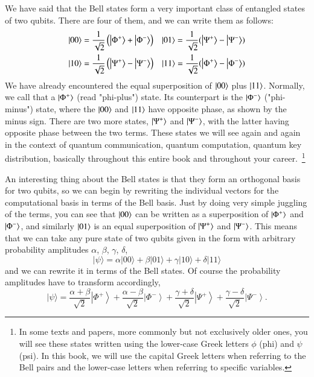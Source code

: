 
We have said that the Bell states form a very important class of entangled states of two qubits. There are four of them, and we can write them as follows: 
\begin{equation}
\begin{aligned}
|00\rangle &=\frac{1}{\sqrt{2}}\left(\left|\Phi^{+}\right\rangle+\left|\Phi^{-}\right\rangle\right) & 
\left| 01 \right\rangle = \frac{1}{\sqrt2}(\left| \Psi^{+} \right\rangle - \left| \Psi^{-} \right\rangle) \\
|10\rangle &=\frac{1}{\sqrt{2}}\left(\left|\Psi^{+}\right\rangle-\left|\Psi^{-}\right\rangle\right) & 
\left| 11 \right\rangle = \frac{1}{\sqrt2}(\left| \Phi^{+} \right\rangle - \left| \Phi^{-} \right\rangle)
\end{aligned}
\end{equation}
We have already encountered the equal superposition of $\left| 00 \right\rangle$ plus $\left| 11 \right\rangle$. Normally, we call that a $\left| \Phi^+ \right\rangle$ (read "phi-plus") state. Its counterpart is the $\left| \Phi^- \right\rangle$ ("phi-minus") state, where the $\left| 00 \right\rangle$ and $\left| 11 \right\rangle$ have opposite phase, as shown by the minus sign. There are two more states, $\left| \Psi^+ \right\rangle$ and $\left| \Psi^- \right\rangle$, with the latter having opposite phase between the two terms.  These states we will see again and again in the context of quantum communication, quantum computation, quantum key distribution, basically throughout this entire book and throughout your career.~\footnote{In some texts and papers, more commonly but not exclusively older ones, you will see these states written using the lower-case Greek letters $\phi$ (phi) and $\psi$ (psi).  In this book, we will use the capital Greek letters when referring to the Bell pairs and the lower-case letters when referring to specific variables.} 

An interesting thing about the Bell states is that they form an orthogonal basis for two qubits, so we can begin by rewriting the individual vectors for the computational basis in terms of the Bell basis. Just by doing very simple juggling of the terms, you can see that $\left| 00 \right\rangle$ can be written as a superposition of $\left| \Phi^+ \right\rangle$ and $\left| \Phi^- \right\rangle$, and similarly $\left| 01 \right\rangle$ is an equal superposition of $\left| \Psi^+ \right\rangle$ and $\left| \Psi^- \right\rangle$.
This means that we can take any pure state of two qubits given in the form with arbitrary probability amplitudes $\alpha$, $\beta$, $\gamma$, $\delta$,
\begin{equation}
|\psi\rangle=\alpha|00\rangle+\beta|01\rangle+\gamma|10\rangle+\delta|11\rangle
\end{equation}
and we can rewrite it in terms of the Bell states.  Of course the probability amplitudes have to transform accordingly,
\begin{equation}
|\psi\rangle=\frac{\alpha+\beta}{\sqrt{2}}\left|\Phi^{+}\right\rangle+\frac{\alpha-\beta}{\sqrt{2}}\left|\Phi^{-}\right\rangle+\frac{\gamma+\delta}{\sqrt{2}}\left|\Psi^{+}\right\rangle+\frac{\gamma-\delta}{\sqrt{2}}\left|\Psi^{-}\right\rangle.
\end{equation}

